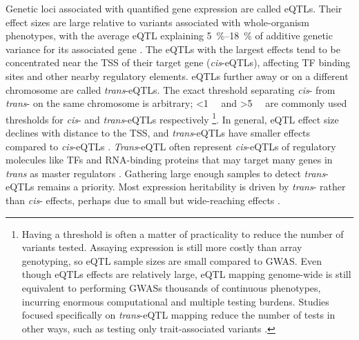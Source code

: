 \begin{outline}
Genetic loci associated with quantified gene expression are called \glspl{eQTL}.
Their effect sizes are large relative to variants associated with whole-organism phenotypes,
with the average \gls{eQTL} explaining \SIrange{5}{18}{\percent} of additive genetic variance for its associated gene \autocite{gaffney2013GlobalPropertiesFunctional}.
The \glspl{eQTL} with the largest effects tend to be concentrated near the \gls{TSS} of their target gene (\textit{cis}-\glspl{eQTL}), affecting \gls{TF} binding sites and other nearby regulatory elements.
\glspl{eQTL} further away or on a different chromosome are called \textit{trans}-\glspl{eQTL}.
The exact threshold separating \textit{cis}- from \textit{trans}- on the same chromosome is arbitrary; \SI{<1}{\mega\bp} and \SI{>5}{\mega\bp} are commonly used thresholds for \textit{cis}- and \textit{trans}-\glspl{eQTL} respectively \autocite{westra2014GenomeFunctionStudying,albert2015RoleRegulatoryVariation,vosa2018UnravelingPolygenicArchitecture}%
\footnote{
    Having a threshold is often a matter of practicality to reduce the number of variants tested.
    Assaying expression is still more costly than array genotyping, so \gls{eQTL} sample sizes are small compared to \gls{GWAS}.
    Even though \glspl{eQTL} effects are relatively large, \gls{eQTL} mapping genome-wide is still equivalent to performing \glspl{GWAS} thousands of continuous phenotypes,
    incurring enormous computational and multiple testing burdens.
    Studies focused specifically on \textit{trans}-\gls{eQTL} mapping reduce the number of tests in other ways, such as testing only trait-associated variants \autocite{vosa2018UnravelingPolygenicArchitecture}.
}.
In general, \gls{eQTL} effect size declines with distance to the \gls{TSS}, and \textit{trans}-\glspl{eQTL} have smaller effects compared to \textit{cis}-\glspl{eQTL} \autocite{vandiedonck2017GeneticAssociationMolecular}.
\textit{Trans}-\gls{eQTL} often represent \textit{cis}-\glspl{eQTL} of regulatory molecules like \glspl{TF} and RNA-binding proteins that may target many genes in \textit{trans} as master regulators \autocite{fairfax2012GeneticsGeneExpression,albert2015RoleRegulatoryVariation}.
Gathering large enough samples to detect \textit{trans}-\glspl{eQTL} remains a priority.
Most expression heritability is driven by \textit{trans}- rather than \textit{cis}- effects,
perhaps due to small but wide-reaching effects \autocite{liu2019TransEffectsGene}.


\end{outline}

